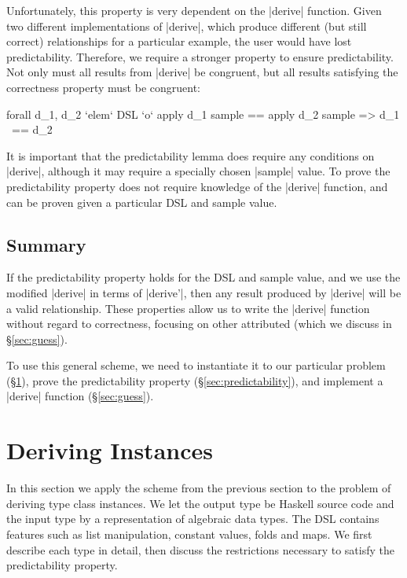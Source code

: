 \documentclass[preprint]{sigplanconf}
\begin{document}
Unfortunately, this property is very dependent on the |derive| function. Given two different implementations of |derive|, which produce different (but still correct) relationships for a particular example, the user would have lost predictability. Therefore, we require a stronger property to ensure predictability. Not only must all results from |derive| be congruent, but all results satisfying the correctness property must be congruent:

\ignore\begin{code}
forall d_1, d_2 `elem` DSL `o` apply d_1 sample == apply d_2 sample => d_1 ~== d_2
\end{code}

It is important that the predictability lemma does require any conditions on |derive|, although it may require a specially chosen |sample| value. To prove the predictability property does not require knowledge of the |derive| function, and can be proven given a particular DSL and sample value.

\subsection{Summary}

If the predictability property holds for the DSL and sample value, and we use the modified |derive| in terms of |derive'|, then any result produced by |derive| will be a valid relationship. These properties allow us to write the |derive| function without regard to correctness, focusing on other attributed (which we discuss in \S\ref{sec:guess}).

To use this general scheme, we need to instantiate it to our particular problem (\S\ref{sec:instances}), prove the predictability property (\S\ref{sec:predictability}), and implement a |derive| function (\S\ref{sec:guess}).

\section{Deriving Instances}
\label{sec:instances}

In this section we apply the scheme from the previous section to the problem of deriving type class instances. We let the output type be Haskell source code and the input type by a representation of algebraic data types. The DSL contains features such as list manipulation, constant values, folds and maps. We first describe each type in detail, then discuss the restrictions necessary to satisfy the predictability property.
\end{document}
